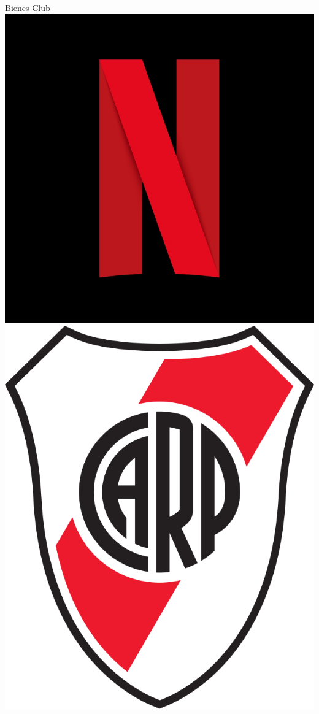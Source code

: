 \documentclass{beamer}
\begin{document}
\begin{frame}{Bienes Club}
    \centering
    \includegraphics[scale=0.12]{../Figures/M18.3.jpg}
    \hspace{15mm}
    \includegraphics[scale=0.14]{../Figures/M18.4.png}
\end{frame}
\end{document}
